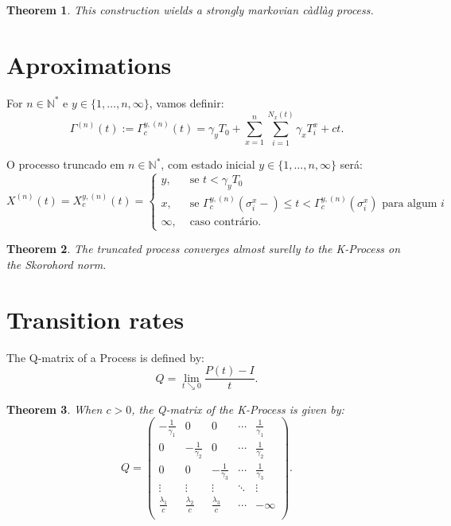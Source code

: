 \documentclass[a1,portrait]{a0poster}
\newtheorem{teorema}{Theorem}
\newcommand{\Nz}{{\mathbb{N^*}}}
\begin{document}
\begin{textblock}{15}
\begin{teorema}
  This construction wields a strongly markovian càdlàg process.
\end{teorema}


\section{Aproximations}

For $n \in \Nz$ e $y \in \{1, \ldots, n, \infty\}$,
vamos definir:
\begin{displaymath}
  \Gamma^{(n)} (t) := \Gamma^{y,(n)}_c (t) = \gamma_y T_0
  + \sum_{x =1}^{n} \sum_{i = 1}^{N_x(t)}
  \gamma_x T_i^x
  + ct.
\end{displaymath}

O processo truncado em $n \in \Nz$, com estado inicial $y \in \{1,
\ldots, n, \infty\}$ será:
\begin{displaymath}
  X^{(n)}(t) = X^{y,(n)}_c(t) = \begin{cases}
    y, & \textrm{ se }  t < \gamma_y T_0 \\
    x, & \textrm{ se } \Gamma^{y,(n)}_c(\sigma_i^x-) \leq t <
    \Gamma^{y,(n)}_c(\sigma^x_i)
    \text{ para algum } i \\
    \infty, & \textrm{ caso contrário.}
  \end{cases}
\end{displaymath}


\begin{teorema}
  The truncated process converges almost surelly to the K-Process on
  the Skorohord norm.
\end{teorema}


  \section{Transition rates}

  The Q-matrix of a Process is defined by:
  \begin{displaymath}
    Q = \lim_{t \searrow 0} \frac{P(t) - I}{t}.
  \end{displaymath}

  \begin{teorema}
    When $c > 0$, the Q-matrix of the K-Process is given by:
    \begin{displaymath}
      Q = \left(
        \begin{array}{ccccc}
          -\frac{1}{\gamma_1} & 0 & 0 & \cdots & \frac{1}{\gamma_1}\\
          0 & -\frac{1}{\gamma_2} & 0 & \cdots & \frac{1}{\gamma_2}\\
          0 & 0 & -\frac{1}{\gamma_3} & \cdots & \frac{1}{\gamma_3}\\
          \vdots & \vdots & \vdots & \ddots & \vdots \\
          \frac{\lambda_1}{c} & \frac{\lambda_2}{c} &
          \frac{\lambda_3}{c} & \cdots & -\infty\\
        \end{array}
      \right).
    \end{displaymath}
  \end{teorema}


\end{textblock}
\end{document}
